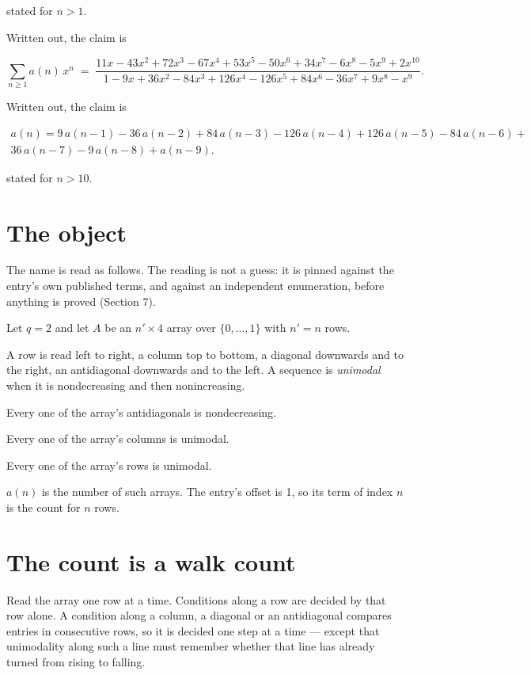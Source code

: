 \documentclass[11pt]{article}
\theoremstyle{definition}
\begin{document}
stated for $n > 1$.

Written out, the claim is

\[\sum_{n \ge 1} a(n)\,x^n \;=\; \frac{11x - 43x^{2} + 72x^{3} - 67x^{4} + 53x^{5} - 50x^{6} + 34x^{7} - 6x^{8} - 5x^{9} + 2x^{10}}{1 - 9x + 36x^{2} - 84x^{3} + 126x^{4} - 126x^{5} + 84x^{6} - 36x^{7} + 9x^{8} - x^{9}}.\]

Written out, the claim is

\begin{multline*} a(n) = 9\,a(n-1) - 36\,a(n-2) + 84\,a(n-3) - 126\,a(n-4) + 126\,a(n-5) - 84\,a(n-6) + \\ 36\,a(n-7) - 9\,a(n-8) + a(n-9). \end{multline*}

stated for $n > 10$.

\section{The object}

The name is read as follows. The reading is not a guess: it is pinned against the entry's own published terms, and against an independent enumeration, before anything is proved (Section 7).

Let $q = 2$ and let $A$ be an $n' \times 4$ array over $\{0,\dots,1\}$ with $n' = n$ rows.

A row is read left to right, a column top to bottom, a diagonal downwards and to the right, an antidiagonal downwards and to the left. A sequence is {\itshape unimodal} when it is nondecreasing and then nonincreasing.

Every one of the array's antidiagonals is nondecreasing.

Every one of the array's columns is unimodal.

Every one of the array's rows is unimodal.

$a(n)$ is the number of such arrays. The entry's offset is 1, so its term of index $n$ is the count for $n$ rows.

\section{The count is a walk count}

Read the array one row at a time. Conditions along a row are decided by that row alone. A condition along a column, a diagonal or an antidiagonal compares entries in consecutive rows, so it is decided one step at a time --- except that unimodality along such a line must remember whether that line has already turned from rising to falling.
\end{document}
